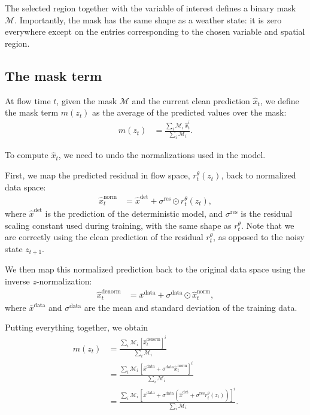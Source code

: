 \documentclass[a4paper,12pt]{article}
\begin{document}
The selected region together with the variable of interest defines a binary mask $\mathcal{M}$.
Importantly, the mask has the same shape as a weather state: it is zero everywhere except on the entries corresponding to the chosen variable and spatial region.

\subsection{The mask term}

At flow time $t$, given the mask $\mathcal{M}$ and the current clean prediction $\hat{x}_t$, we define the mask term $m(z_t)$ as the average of the predicted values over the mask:
\begin{align*} 
    m(z_t) &= \frac{\sum_i \mathcal{M}_i \, \hat{x}_t^i}{\sum_i \mathcal{M}_i}.
\end{align*}

To compute $\hat{x}_t$, we need to undo the normalizations used in the model.

First, we map the predicted residual in flow space, $r_t^\theta(z_t)$, back to normalized data space:
\begin{align*} 
    \hat{x}^{\text{norm}}_t &= \hat{x}^{\text{det}} + \sigma^{\text{res}} \odot r_t^\theta(z_t),
\end{align*}
where $\hat{x}^{\text{det}}$ is the prediction of the deterministic model, and $\sigma^{\text{res}}$ is the residual scaling constant used during training, with the same shape as $r_t^\theta$.
Note that we are correctly using the clean prediction of the residual $r_t^\theta$, as opposed to the noisy state $z_{t+1}$. 

We then map this normalized prediction back to the original data space using the inverse $z$-normalization:
\begin{align*} 
    \hat{x}^{\text{denorm}}_t &= \bar{x}^{\text{data}} + \sigma^{\text{data}} \odot \hat{x}^{\text{norm}}_t,
\end{align*}
where $\bar{x}^{\text{data}}$ and $\sigma^{\text{data}}$ are the mean and standard deviation of the training data.

Putting everything together, we obtain
\begin{align*} 
    m(z_t) &= \frac{\sum_i \mathcal{M}_i \, [\hat{x}^{\text{denorm}}_t]^i}{\sum_i \mathcal{M}_i} \\
    &= \frac{\sum_i \mathcal{M}_i \, [\bar{x}^{\text{data}} + \sigma^{\text{data}} \hat{x}^{\text{norm}}_t]^i}{\sum_i \mathcal{M}_i} \\
    &= \frac{\sum_i \mathcal{M}_i \, [\bar{x}^{\text{data}} + \sigma^{\text{data}}(\hat{x}^{\text{det}} + \sigma^{\text{res}} r_t^\theta(z_t))]^i}{\sum_i \mathcal{M}_i}.
\end{align*}
\end{document}
